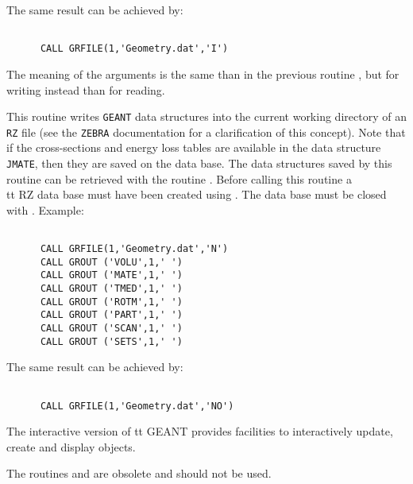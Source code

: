 The same result can be achieved by:
\begin{verbatim}

      CALL GRFILE(1,'Geometry.dat','I')
\end{verbatim}

The meaning of the arguments is the same than in the previous routine
, but for writing instead than for reading.

This routine writes {\tt GEANT} data structures into the current working
directory of an {\tt RZ} file (see the {\tt ZEBRA} documentation for
a clarification of this concept).
Note that if the cross-sections and energy loss tables
are available in the data structure {\tt JMATE}, then they are
saved on the data base.
The data structures saved by this routine can be retrieved
with the routine .
Before calling this routine a {\\tt RZ} data base must have been
created using .
The data base must be closed with . Example:
\begin{verbatim}

      CALL GRFILE(1,'Geometry.dat','N')
      CALL GROUT ('VOLU',1,' ') 
      CALL GROUT ('MATE',1,' ')
      CALL GROUT ('TMED',1,' ')
      CALL GROUT ('ROTM',1,' ')
      CALL GROUT ('PART',1,' ')
      CALL GROUT ('SCAN',1,' ')
      CALL GROUT ('SETS',1,' ')
\end{verbatim}

The same result can be achieved by:
\begin{verbatim}

      CALL GRFILE(1,'Geometry.dat','NO')
\end{verbatim}

The interactive version of {tt GEANT} provides facilities
to interactively update, create and display objects.


The routines  and  are obsolete and should not 
be used.
